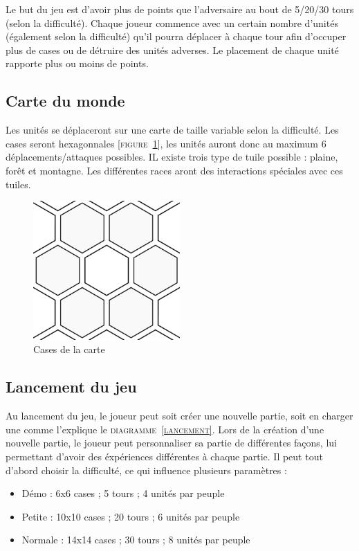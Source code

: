 Le but du jeu est d'avoir plus de points que l'adversaire au bout de 5/20/30 tours (selon la difficulté). Chaque joueur commence avec un certain nombre d'unités (également selon la difficulté) qu'il pourra déplacer à chaque tour afin d'occuper plus de cases ou de détruire des unités adverses. Le placement de chaque unité rapporte plus ou moins de points.

\subsection{Carte du monde}

Les unités se déplaceront sur une carte de taille variable selon la difficulté. Les cases seront hexagonnales [\textsc{figure~\ref{cases}}], les unités auront donc au maximum 6 déplacements/attaques possibles. IL existe trois type de tuile possible : plaine, forêt et montagne. Les différentes races aront des interactions spéciales avec ces tuiles.

\begin{figure}[!h]
\centering
\includegraphics[width=0.5\textwidth]{img/hexagonal.png}
\caption{Cases de la carte}
\label{cases}
\end{figure}

\subsection{Lancement du jeu}

Au lancement du jeu, le joueur peut soit créer une nouvelle partie, soit en charger une comme l'explique le \textsc{diagramme~\ref{lancement}}. Lors de la création d'une nouvelle partie, le joueur peut personnaliser sa partie de différentes façons, lui permettant d'avoir des éxpériences différentes à chaque partie. Il peut tout d'abord choisir la difficulté, ce qui influence plusieurs paramètres :

\begin{itemize}
  \item Démo    :   6x6 cases ;  5 tours ; 4 unités par peuple
  \item Petite  : 10x10 cases ; 20 tours ; 6 unités par peuple
  \item Normale : 14x14 cases ; 30 tours ; 8 unités par peuple
\end{itemize}

